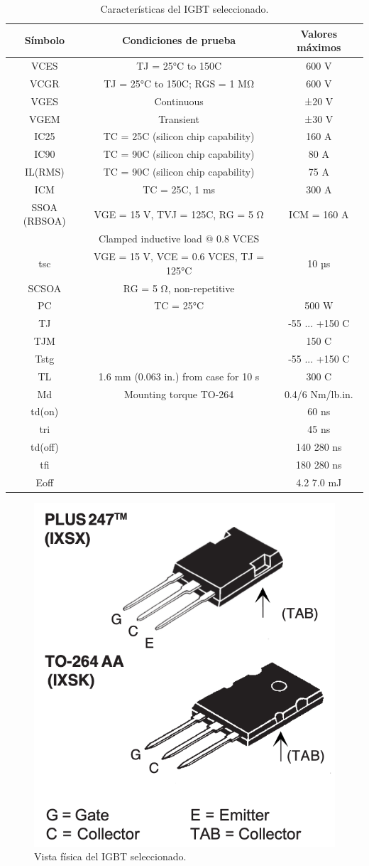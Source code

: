 \begin{table}[h]
	\centering
	\begin{tabular}{|c|c|c|}
		\hline
		\textbf{Símbolo} & \textbf{Condiciones de prueba} & \textbf{Valores máximos} \\ \hline
		VCES & TJ = 25°C to 150C & 600 V \\ \hline
		VCGR & TJ = 25°C to 150C; RGS = 1 MΩ & 600 V \\ \hline
		VGES & Continuous & ±20 V \\ \hline
		VGEM & Transient & ±30 V \\ \hline
		IC25 & TC = 25C (silicon chip capability) & 160 A \\ \hline
		IC90 & TC = 90C (silicon chip capability) & 80 A \\ \hline
		IL(RMS) & TC = 90C (silicon chip capability) & 75 A \\ \hline
		ICM & TC = 25C, 1 ms & 300 A \\ \hline
		SSOA (RBSOA) & VGE = 15 V, TVJ = 125C, RG = 5 Ω & ICM = 160 A \\
		& Clamped inductive load @ 0.8 VCES & \\ \hline
		tsc & VGE = 15 V, VCE = 0.6 VCES, TJ = 125°C & 10 µs \\ \hline
		SCSOA & RG = 5 Ω, non-repetitive & \\ \hline
		PC & TC = 25°C & 500 W \\ \hline
		TJ &  & -55 ... +150 C \\ \hline
		TJM &  & 150 C \\ \hline
		Tstg &  & -55 ... +150 C \\ \hline
		TL & 1.6 mm (0.063 in.) from case for 10 s & 300 C \\ \hline
		Md & Mounting torque TO-264 & 0.4/6 Nm/lb.in. \\ \hline
		td(on) &  & 60 ns \\ \hline
		tri &  & 45 ns \\ \hline
		td(off) &  & 140 280 ns \\ \hline
		tfi &  & 180 280 ns \\ \hline
		Eoff &  & 4.2 7.0 mJ \\ \hline
	\end{tabular}
	\caption{Características del IGBT seleccionado.}
	\label{tab:test_conditions}
\end{table}

\clearpage


\begin{figure}
	\centering
	\includegraphics[width=0.3\linewidth]{img/igbt_to}
	\caption{Vista física del IGBT seleccionado.}
	\label{fig:igbtto}
\end{figure}





